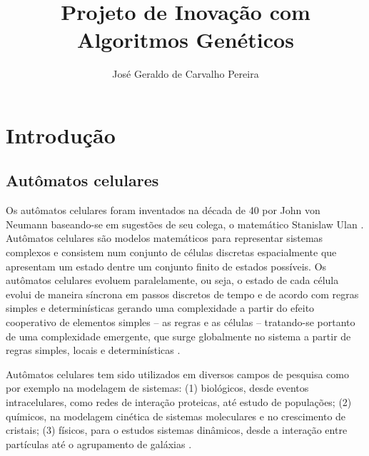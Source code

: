 \documentclass[]{scrreprt}
\title{Projeto de Inovação com Algoritmos Genéticos}
\author{José Geraldo de Carvalho Pereira}
\begin{document}
\maketitle


\chapter{Introdução}
\section{Autômatos celulares}

Os autômatos celulares foram inventados na década de 40 por John von Neumann baseando-se em sugestões de seu colega, o matemático Stanislaw Ulan \cite{citeulike:12886945}. Autômatos celulares são modelos matemáticos para representar sistemas complexos e consistem num conjunto de células discretas espacialmente que apresentam um estado dentre um
conjunto finito de estados possíveis. Os autômatos celulares evoluem paralelamente, ou seja, o estado de cada célula evolui de maneira síncrona em passos discretos de tempo e de acordo com regras simples e determinísticas gerando uma complexidade a partir do efeito cooperativo de elementos simples – as regras e as células – tratando-se portanto de uma complexidade emergente, que surge globalmente no sistema a partir de regras simples, locais e determinísticas \cite{Wolfram19841}.

Autômatos celulares tem sido utilizados em diversos campos de pesquisa 
como por exemplo na modelagem de sistemas: (1) biológicos, desde eventos intracelulares, como redes de interação proteicas, até estudo de populações; (2) químicos, na modelagem cinética de sistemas moleculares e no crescimento de cristais; (3) físicos, para o estudos sistemas dinâmicos, desde a interação entre partículas até o agrupamento de galáxias \cite{Ganguly03asurvey}. 
\end{document}
